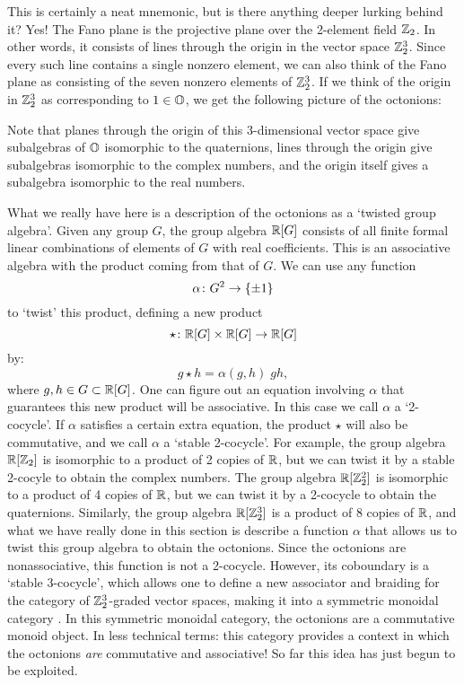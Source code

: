 This is certainly a neat mnemonic, but is there anything deeper lurking   
behind it?  Yes!  The Fano plane is the projective plane over the 2-element
field ${\mathbb Z}_2$.  In other words, it consists of lines through the origin 
in the vector space ${\mathbb Z}_2^3$.  Since every such line contains a single 
nonzero element, we can also think of the Fano plane as consisting of the 
seven nonzero elements of ${\mathbb Z}_2^3$.  If we think of the origin in ${\mathbb Z}_2^3$
as corresponding to $1 \in {\mathbb O}$, we get the following picture of the 
octonions:   

\medskip
\centerline{\epsfysize=1.5in}   
\label{cube}   
\medskip

\noindent    
Note that planes through the origin of this 3-dimensional vector space    
give subalgebras of ${\mathbb O}$ isomorphic to the quaternions, lines through   
the origin give subalgebras isomorphic to the complex numbers, and   
the origin itself gives a subalgebra isomorphic to the real numbers.      
   
What we really have here is a description of the octonions as a
`twisted group algebra'.  Given any group $G$, the group algebra   
${\mathbb R}[G]$ consists of all finite formal linear combinations of elements   
of $G$ with real coefficients.  This is an associative algebra with   
the product coming from that of $G$.  We can use any function    
\[       \alpha \colon G^2 \to \{ \pm 1 \}     \]   
to `twist' this product, defining a new product   
\[       \star \colon {\mathbb R}[G] \times {\mathbb R}[G] \to {\mathbb R}[G]  \]   
by:   
\[       g \star h = \alpha(g,h) \; gh,  \]   
where $g,h \in G \subset {\mathbb R}[G]$.  One can figure out an equation    
involving $\alpha$ that guarantees this new product will be associative.   
In this case we call $\alpha$ a `2-cocycle'.   If $\alpha$ satisfies  a   
certain extra equation, the product $\star$ will also be commutative,   
and we call $\alpha$ a `stable 2-cocycle'.  For example, the group   
algebra  ${\mathbb R}[{\mathbb Z}_2]$ is isomorphic to a product of 2 copies of ${\mathbb R}$,    
but we can twist it by a stable 2-cocyle to obtain the complex numbers.     
The group algebra ${\mathbb R}[{\mathbb Z}_2^2]$ is isomorphic to a product of 4 copies    
of ${\mathbb R}$, but we can twist it by a 2-cocycle to obtain the quaternions.      
Similarly, the group algebra ${\mathbb R}[{\mathbb Z}_2^3]$ is a product of 8 copies of ${\mathbb R}$,    
and what we have really done in this section is describe a function   
$\alpha$ that allows us to twist this group algebra to obtain the   
octonions.  Since the octonions are nonassociative, this function is   
not a 2-cocycle.  However, its coboundary is a `stable 3-cocycle', which  
allows one to define a new associator and braiding for the category of  
${\mathbb Z}_2^3$-graded vector spaces, making it into a symmetric monoidal  
category \cite{AM}.  In this symmetric monoidal category, the octonions  
are a commutative monoid object.  In less technical terms: this category 
provides a context in which the octonions {\it are} commutative and 
associative!  So far this idea has just begun to be exploited. 
   
